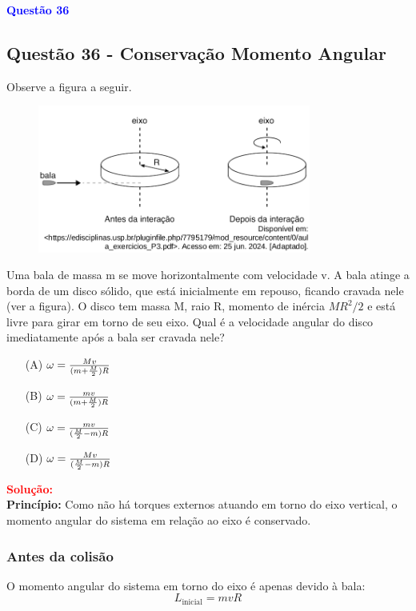 \begin{flushleft}
\textbf{\textcolor{blue}{\Large Quest\~ao 36 }}\\
\noindent
\subsection{Quest\~ao 36 - Conserva\c{c}\~ao Momento Angular}
Observe a figura a seguir.

\begin{figure}[h]
\centering
\includegraphics[width=0.8\textwidth]{figures/momento_angular.png}
\end{figure}

Uma bala de massa m se move horizontalmente com
velocidade v. A bala atinge a borda de um disco sólido, que
está inicialmente em repouso, ficando cravada nele (ver a
figura). O disco tem massa M, raio R, momento de inércia
$MR^{2}/2$ e está livre para girar em torno de seu eixo. Qual é a
velocidade angular do disco imediatamente após a bala ser
cravada nele?

\begin{itemize}
\item[(A)] $\Huge \omega = \frac{Mv}{(m+\frac{M}{2})R}$
\item[(B)] $\Huge \omega = \frac{mv}{(m+\frac{M}{2})R}$
\item[(C)] $\Huge \omega = \frac{mv}{(\frac{M}{2}-m)R}$
\item[(D)] $\Huge \omega = \frac{Mv}{(\frac{M}{2}-m)R}$
\end{itemize}

\vspace{0.5cm}

\textcolor{red}{\textbf{Solução:}}\\

\textbf{Princípio:}  
Como não há torques externos atuando em torno do eixo vertical, o momento angular do sistema em relação ao eixo é conservado.

\subsubsection*{Antes da colisão}
O momento angular do sistema em torno do eixo é apenas devido à bala:
\[
L_{\text{inicial}} = m v R
\]


\end{flushleft}
